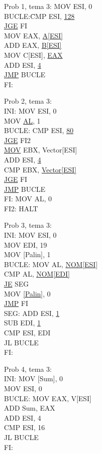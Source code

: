 \documentclass[../main.tex]{subfiles}
\begin{document}
    Prob 1, tema 3:
    MOV ESI, 0\\
    BUCLE:\= CMP ESI, \underline{128}\\
    \underline{JGE} FI\\
    MOV EAX, \underline{A[ESI]}\\
    ADD EAX, \underline{B[ESI]}\\
    MOV C[ESI], \underline{EAX}\\
    ADD ESI, \underline{4}\\
    \underline{JMP} BUCLE\\
    FI:
    
    Prob 2, tema 3:\\
    INI: MOV ESI, 0\\
    MOV \underline{AL}, 1\\
    BUCLE: CMP ESI, \underline{80}\\
    \underline{JGE} FI2\\
    \underline{MOV} EBX, Vector[ESI]\\
    ADD ESI, \underline{4}\\
    CMP EBX, \underline{Vector[ESI]}\\
    \underline{JGE} FI\\
    \underline{JMP} BUCLE\\
    FI: MOV AL, 0\\
    FI2: HALT
    
    Prob 3, tema 3:\\
    INI: MOV ESI, 0\\
    MOV EDI, 19\\
    MOV [Palin], 1\\ 
    BUCLE: MOV AL, \underline{NOM[ESI]}\\
    CMP AL, \underline{NOM[EDI]}\\
    \underline{JE} SEG\\
    MOV \underline{[Palin]}, 0\\
    \underline{JMP} FI\\
    SEG: ADD ESI, \underline{1}\\
    SUB EDI, \underline{1}\\
    CMP ESI, EDI\\
    JL BUCLE\\
    FI:
    
    Prob 4, tema 3:\\
    INI: MOV [Sum], 0\\
    MOV ESI, 0\\
    BUCLE: MOV EAX, V[ESI]\\
    ADD Sum, EAX\\
    ADD ESI, 4\\
    CMP ESI, 16\\
    JL BUCLE\\
    FI: \\
    
\end{document}
